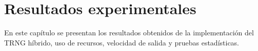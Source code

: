 \chapter{Resultados experimentales}

    En este capítulo se presentan los resultados obtenidos de la implementación del TRNG híbrido, uso de recursos, velocidad de salida y pruebas estadísticas.

   